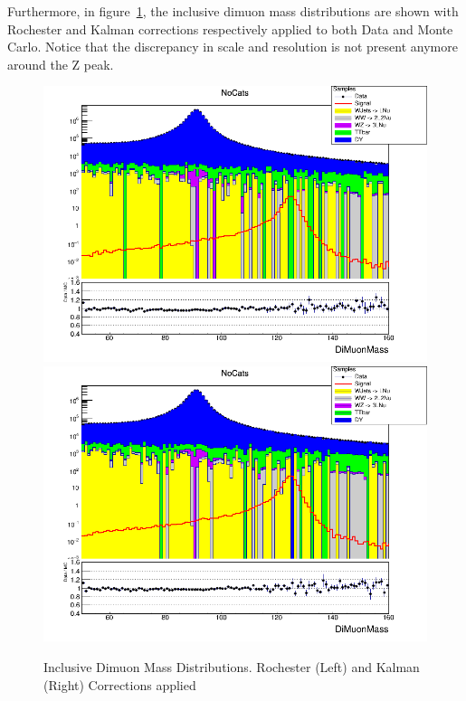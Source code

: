 Furthermore, in figure~\ref{fig:higgs_selections_inclusivemass}, the inclusive dimuon mass distributions are shown with Rochester and Kalman corrections respectively applied to both Data and Monte Carlo. Notice that the discrepancy in scale and resolution is not present anymore around the Z peak.
\begin{figure}[htbp]
  \centering
  \includegraphics[width=0.9\linewidth]{figures/ch_higgs/distributions/baseline_rochester/distribution__NoCats__DiMuonMass__logY.png}\\
  \includegraphics[width=0.9\linewidth]{figures/ch_higgs/distributions/baseline_kalman/distribution__NoCats__DiMuonMass__logY.png}
  \caption{Inclusive Dimuon Mass Distributions. Rochester (Left) and Kalman (Right) Corrections applied}
  \label{fig:higgs_selections_inclusivemass}
\end{figure}




